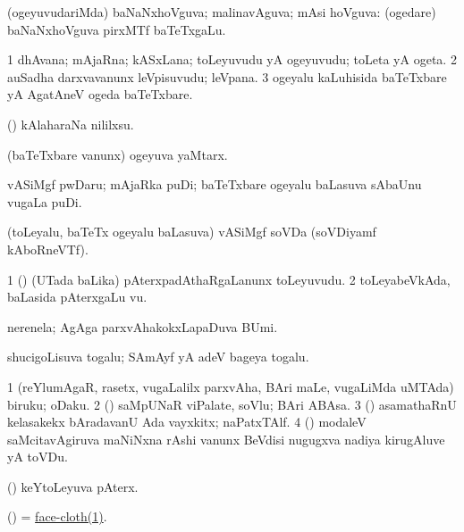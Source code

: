 \bentry 
{} 
\gl{\gu}
\expl{}
\bmng
(ogeyuvudariMda) baNaNxhoVguva; malinavAguva; mAsi hoVguva:  (ogedare) baNaNxhoVguva pirxMTf baTeTxgaLu. 
\emng
\eentry

\bentry 
{} 
\gl{\nA}
\expl{}
\bmng
\bnum
\num{1} dhAvana; mAjaRna; kASxLana; toLeyuvudu yA ogeyuvudu; toLeta yA ogeta. 
\num{2} auSadha darxvavanunx leVpisuvudu; leVpana. 
\num{3} ogeyalu kaLuhisida baTeTxbare yA AgatAneV ogeda baTeTxbare. 
\enum
\emng

\noindent 
\gl{\pagu}
\expl{}
\bmng
{} (\ashi) kAlaharaNa nililxsu. 
\emng
\eentry

\bentry
{} 
\gl{\nA}
\expl{}
\bmng
(baTeTxbare \mo vanunx) ogeyuva yaMtarx. 
\emng
\eentry

\bentry
{} 
\gl{\nA}
\expl{}
\bmng
vASiMgf pwDaru; mAjaRka puDi; baTeTxbare ogeyalu baLasuva sAbaUnu \mo vugaLa puDi. 
\emng
\eentry

\bentry
{} 
\gl{\nA}
\expl{}
\bmng
(toLeyalu, baTeTx ogeyalu baLasuva) vASiMgf soVDa (soVDiyamf kAboRneVTf). 
\emng
\eentry

\bentry
{} 
\gl{\nA}
\expl{}
\bmng
\bnum
\num{1} (\birx) (UTada baLika) pAterxpadAthaRgaLanunx toLeyuvudu. 
\num{2} toLeyabeVkAda, baLasida pAterxgaLu \mo vu. 
\enum
\emng
\eentry

\bentry
{} 
\gl{\nA}
\expl{}
\bmng
nerenela; AgAga parxvAhakokxLapaDuva BUmi. 
\emng
\eentry

\bentry
{} 
\gl{\nA}
\expl{}
\bmng
shucigoLisuva togalu; SAmAyf yA adeV bageya togalu. 
\emng
\eentry

\bentry
{} 
\bmng
\bnum
\num{1} (reYlumAgaR, rasetx, \mo vugaLalilx parxvAha, BAri maLe, \mo vugaLiMda uMTAda) biruku; oDaku. 
\num{2} (\AmA) saMpUNaR viPalate, soVlu; BAri ABAsa. 
\num{3} (\ashi) asamathaRnU kelasakekx bAradavanU Ada vayxkitx; naPatxTAlf. 
\num{4} (\BUvi) modaleV saMcitavAgiruva maNiNxna rAshi \mo vanunx BeVdisi nugugxva nadiya kirugAluve yA toVDu. 
\enum
\emng
\eentry

\bentry
{} 
\gl{\nA}
\expl{}
\bmng
(\pArxparx) keYtoLeyuva pAterx. 
\emng
\eentry

\bentry
{} 
\gl{\nA}
\expl{}
\bmng
(\ame) = \hyperref{kandict_f.pdf}{F}{face-cloth(1)}{face-cloth(1)}. 
\emng
\eentry

